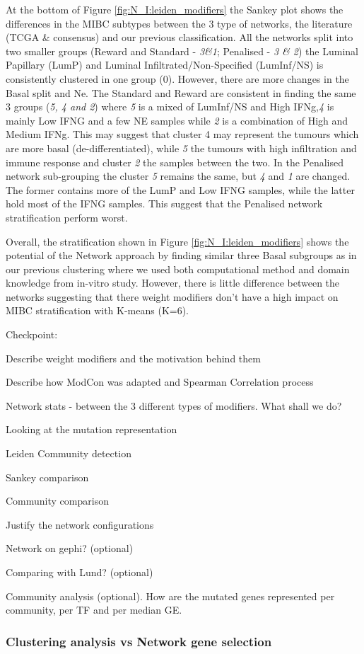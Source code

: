At the bottom of Figure \ref{fig:N_I:leiden_modifiers} the Sankey plot shows the differences in the MIBC subtypes between the 3 type of networks, the literature (TCGA \& consensus) and our previous classification. All the networks split into two smaller groups (Reward and Standard - \textit{3\&1}; Penalised - \textit{3 \& 2}) the Luminal Papillary (LumP) and Luminal Infiltrated/Non-Specified (LumInf/NS) is consistently clustered in one group (0). However, there are more changes in the Basal split and Ne. The Standard and Reward are consistent in finding the same 3 groups (\textit{5, 4 and 2}) where\textit{ 5} is a mixed of LumInf/NS and High IFNg,\textit{4} is mainly Low IFNG and a few NE samples while \textit{2} is a combination of High and Medium IFNg. This may suggest that cluster 4 may represent the tumours which are more basal (de-differentiated), while \textit{5} the tumours with high infiltration and immune response and cluster \textit{2} the samples between the two. In the Penalised network sub-grouping the cluster \textit{5} remains the same, but \textit{4} and \textit{1} are changed. The former contains more of the LumP and Low IFNG samples, while the latter hold most of the IFNG samples. This suggest that the Penalised network stratification perform worst.

Overall, the stratification shown in Figure \ref{fig:N_I:leiden_modifiers} shows the potential of the Network approach by finding similar three Basal subgroups as in our previous clustering where we used both computational method and domain knowledge from in-vitro study\citet{Baker2022-bj}. However, there is little difference between the networks suggesting that there weight modifiers don't have a high impact on MIBC stratification with K-means (K=6).
 

\newpage

Checkpoint:
\begin{todolist}
    \item [\done] Describe weight modifiers and the motivation behind them
    \item [\done] Describe how ModCon was adapted and Spearman Correlation process 
    \item [\done] Network stats - between the 3 different types of modifiers. What shall we do?
    \item [\done] Looking at the mutation representation 
    \item [\done] Leiden Community detection
    \item [\done] Sankey comparison
    \item [\done] Community comparison 
    \item [\done] Justify the network configurations
    \item Network on gephi? (optional)
    \item Comparing with Lund? (optional)
    \item Community analysis (optional). How are the mutated genes represented per community, per TF and per median GE.
\end{todolist}

\newpage

\subsubsection{Clustering analysis vs Network gene selection}


